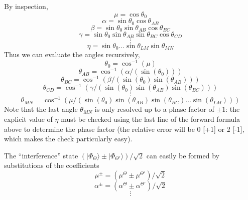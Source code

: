 By inspection,
\begin{equation}
\mu
=
\cos \theta_{0}
\end{equation}
\begin{equation}
\alpha
=
\sin \theta_{0}
\cos \theta_{AB}
\end{equation}
\begin{equation}
\beta
=
\sin \theta_{0}
\sin \theta_{AB}
\cos \theta_{BC}
\end{equation}
\begin{equation}
\gamma
=
\sin \theta_{0}
\sin \theta_{AB}
\sin \theta_{BC}
\cos \theta_{CD}
\end{equation}
\begin{equation}
\vdots
\end{equation}
\begin{equation}
\eta
=
\sin \theta_{0}
\ldots
\sin \theta_{LM}
\sin \theta_{MN}
\end{equation}
Thus we can evaluate the angles recursively,
\begin{equation}
\theta_{0}
=
\cos^{-1} (\mu)
\end{equation}
\begin{equation}
\theta_{AB}
=
\cos^{-1} (\alpha / (\sin(\theta_{0})))
\end{equation}
\begin{equation}
\theta_{BC}
=
\cos^{-1} (\beta / (\sin(\theta_{0}) \sin(\theta_{AB})))
\end{equation}
\begin{equation}
\theta_{CD}
=
\cos^{-1} (\gamma / (\sin(\theta_{0}) \sin(\theta_{AB}) \sin(\theta_{BC})))
\end{equation}
\begin{equation}
\vdots
\end{equation}
\begin{equation}
\theta_{MN}
=
\cos^{-1} (\mu / (\sin(\theta_{0}) \sin(\theta_{AB}) \sin(\theta_{BC}) \ldots \sin(\theta_{LM})))
\end{equation}
Note that the last angle $\theta_{MN}$ is only resolved up to a phase factor of
$\pm 1$: the explicit value of $\eta$ must be checked using the last line of the
forward formula above to determine the phase factor (the relative error will be
0 [+1] or 2 [-1], which makes the check particularly easy).

The ``interference'' state $(|\Phi_{\Theta}\rangle \pm | \Phi_{\Theta'} \rangle)
/ \sqrt{2}$ can easily be formed by substitutions of the coefficients
\begin{equation}
\mu^{\pm}
=
(
\mu^{\Theta}
\pm
\mu^{\Theta'}
) / \sqrt{2}
\end{equation}
\begin{equation}
\alpha^{\pm}
=
(
\alpha^{\Theta}
\pm
\alpha^{\Theta'}
) / \sqrt{2}
\end{equation}
\begin{equation}
\vdots
\end{equation}

